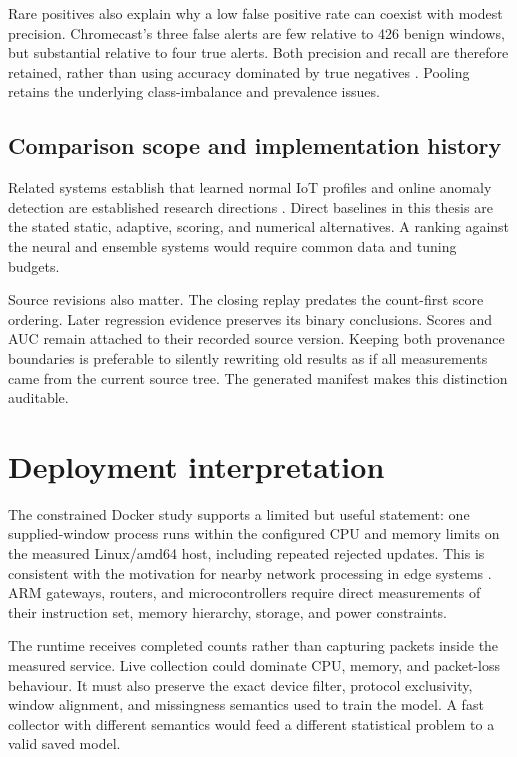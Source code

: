 Rare positives also explain why a low false positive rate can coexist
with modest precision. Chromecast's three false alerts are few
relative to 426 benign windows, but substantial relative to four
true alerts. Both precision and recall are therefore retained,
rather than using accuracy dominated by true negatives
\cite{saito2015}. Pooling retains the underlying class-imbalance and
prevalence issues.

\subsection{Comparison scope and implementation history}

Related systems establish that learned normal IoT profiles and
online anomaly detection are established research directions
\cite{meidan2018,mirsky2018,nguyen2019}. Direct baselines in this thesis are
the stated static, adaptive, scoring, and numerical alternatives. A ranking
against the neural and ensemble systems would require common data and tuning
budgets.

Source revisions also matter. The closing replay predates the
count-first score ordering. Later regression evidence preserves its
binary conclusions. Scores and AUC remain attached to their recorded source
version. Keeping both provenance boundaries is preferable to silently
rewriting old results as if all measurements came from the current
source tree. The generated manifest makes this distinction auditable.

\section{Deployment interpretation}
\label{sec:deployment-discussion}

The constrained Docker study supports a limited but useful statement:
one supplied-window process runs within the configured CPU and memory
limits on the measured Linux/amd64 host, including repeated rejected
updates. This is consistent with the motivation for nearby network
processing in edge systems \cite{shi2016}. ARM gateways, routers, and
microcontrollers require direct measurements of their instruction set,
memory hierarchy, storage, and power constraints.

The runtime receives completed counts rather than capturing packets
inside the measured service. Live collection could dominate CPU,
memory, and packet-loss behaviour. It must also preserve the exact
device filter, protocol exclusivity, window alignment, and missingness
semantics used to train the model. A fast collector with different
semantics would feed a different statistical problem to a valid
saved model.

